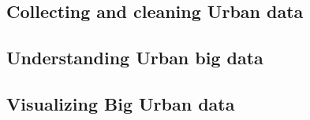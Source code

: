 \subsection{Collecting and cleaning Urban data}

\subsection{Understanding Urban big data}

\subsection{Visualizing Big Urban data}

